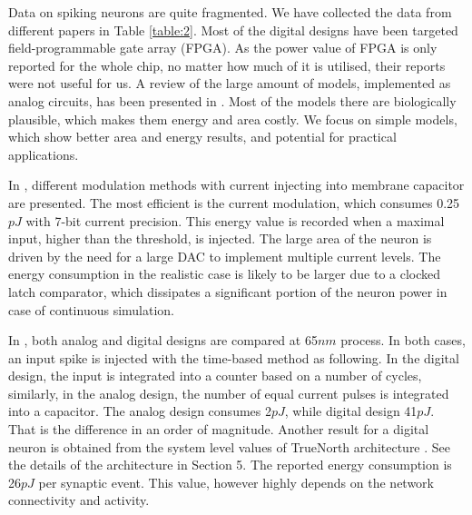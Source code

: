 \documentclass[conference, compsoc]{IEEEtran}
\begin{document}
Data on spiking neurons are quite fragmented. We have collected the data from different papers in Table \ref{table:2}. Most of the digital designs have been targeted field-programmable gate array (FPGA). As the power value of FPGA is only reported for the whole chip, no matter how much of it is utilised, their reports were not useful for us. A review of the large amount of models, implemented as analog circuits, has been presented in \cite{Indiveri}. Most of the models there are biologically plausible, which makes them energy and area costly. We focus on simple models, which show better area and energy results, and potential for practical applications.

In \cite{Phong}, different modulation methods with current injecting into membrane capacitor are presented. The most efficient is the current modulation, which consumes 0.25$ pJ $ with 7-bit current precision. This energy value is recorded when a maximal input, higher than the threshold, is injected. The large area of the neuron is driven by the need for a large DAC to implement multiple current levels. The energy consumption in the realistic case is likely to be larger due to a clocked latch comparator, which dissipates a significant portion of the neuron power in case of continuous simulation.

In \cite{HardwareOrAnalog}, both analog and digital designs are compared at 65$ nm $ process. In both cases, an input spike is injected with the time-based method as following. In the digital design, the  input is integrated into a counter based on a number of cycles, similarly, in the analog design, the number of equal current pulses is integrated into a capacitor. The analog design consumes 2$ pJ $, while digital design 41$ pJ $. That is the difference in an order of magnitude. Another result for a digital neuron is obtained from the system level values of TrueNorth architecture \cite{TrueNorth}. See the details of the architecture in Section 5. The reported energy consumption is 26$ pJ $ per synaptic event. This value, however highly depends on the network connectivity and activity.
\end{document}

